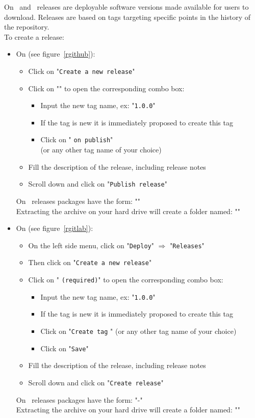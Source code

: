 On \github\ and \gitlab\ releases are deployable software versions made available for users to download. 
Releases are based on tags targeting specific points in the history of the repository. \\
To create a release: 
\begin{itemize}
\item On \github (see figure~\ref{rgithub}):
\begin{itemize}
\item Click on "\texttt{Create a new release}"
\item Click on "" to open the corresponding combo box:
\begin{itemize}
\item Input the new tag name, ex: "\texttt{1.0.0}" 
\item If the tag is new it is immediately proposed to create this tag
\item Click on "  \texttt{on publish}" \\
(or any other tag name of your choice)
\end{itemize}
\item Fill the description of the release, including release notes
\item Scroll down and click on "\texttt{Publish release}"
\end{itemize}
On \github\ releases packages have the form: "" \\
Extracting the archive on your hard drive will create a folder named: ""
\item On \gitlab (see figure~\ref{rgitlab}):
\begin{itemize}
\item On the left side menu, click on "\texttt{Deploy}" $\Longrightarrow$ "\texttt{Releases}"
\item Then click on "\texttt{Create a new release}"
\item Click on " \texttt{(required)}" to open the corresponding combo box:
\begin{itemize}
\item Input the new tag name, ex: "\texttt{1.0.0}" 
\item If the tag is new it is immediately proposed to create this tag
\item Click on "\texttt{Create tag} " (or any other tag name of your choice)
\item Click on "\texttt{Save}"
\end{itemize}
\item Fill the description of the release, including release notes
\item Scroll down and click on "\texttt{Create release}"
\end{itemize}
On \gitlab\ releases packages have the form: "-" \\
Extracting the archive on your hard drive will create a folder named: ""
\end{itemize}

